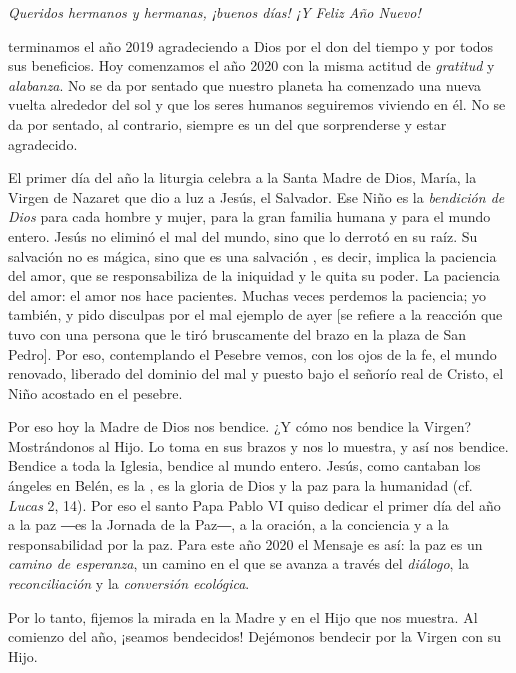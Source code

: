 \begin{body}
	\emph{Queridos hermanos y hermanas, ¡buenos días! ¡Y Feliz Año Nuevo!}
	
	 terminamos el año 2019 agradeciendo a Dios por el don del tiempo y por todos sus beneficios. Hoy comenzamos el año 2020 con la misma actitud de \emph{gratitud} y \emph{alabanza}. No se da por sentado que nuestro planeta ha comenzado una nueva vuelta alrededor del sol y que los seres humanos seguiremos viviendo en él. No se da por sentado, al contrario, siempre es un  del que sorprenderse y estar agradecido.
	
	El primer día del año la liturgia celebra a la Santa Madre de Dios, María, la Virgen de Nazaret que dio a luz a Jesús, el Salvador. Ese Niño es la \emph{bendición de Dios} para cada hombre y mujer, para la gran familia humana y para el mundo entero. Jesús no eliminó el mal del mundo, sino que lo derrotó en su raíz. Su salvación no es mágica, sino que es una salvación , es decir, implica la paciencia del amor, que se responsabiliza de la iniquidad y le quita su poder. La paciencia del amor: el amor nos hace pacientes. Muchas veces perdemos la paciencia; yo también, y pido disculpas por el mal ejemplo de ayer {[}se refiere a la reacción que tuvo con una persona que le tiró bruscamente del brazo en la plaza de San Pedro{]}. Por eso, contemplando el Pesebre vemos, con los ojos de la fe, el mundo renovado, liberado del dominio del mal y puesto bajo el señorío real de Cristo, el Niño acostado en el pesebre.
	
	Por eso hoy la Madre de Dios nos bendice. ¿Y cómo nos bendice la Virgen? Mostrándonos al Hijo. Lo toma en sus brazos y nos lo muestra, y así nos bendice. Bendice a toda la Iglesia, bendice al mundo entero. Jesús, como cantaban los ángeles en Belén, es la , es la gloria de Dios y la paz para la humanidad (cf. \emph{Lucas} 2, 14). Por eso el santo Papa Pablo VI quiso dedicar el primer día del año a la paz ―es la Jornada de la Paz―, a la oración, a la conciencia y a la responsabilidad por la paz. Para este año 2020 el Mensaje es así: la paz es un \emph{camino de esperanza}, un camino en el que se avanza a través del \emph{diálogo}, la \emph{reconciliación} y la \emph{conversión ecológica}.
	
	Por lo tanto, fijemos la mirada en la Madre y en el Hijo que nos muestra. Al comienzo del año, ¡seamos bendecidos! Dejémonos bendecir por la Virgen con su Hijo.
	

\end{body}
